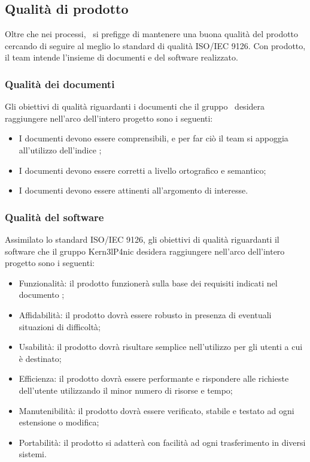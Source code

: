 \documentclass[../PianoDiQualifica.tex]{subfiles}
\begin{document}
		\subsection{Qualità di prodotto}
		Oltre che nei processi, \kpanic\ si prefigge di mantenere una buona qualità del prodotto cercando di seguire al meglio lo standard di qualità ISO/IEC 9126. Con prodotto, il team intende l'insieme di documenti e del software realizzato.
			\subsubsection{Qualità dei documenti}
			Gli obiettivi di qualità riguardanti i documenti che il gruppo \kpanic\ desidera raggiungere nell'arco dell'intero progetto sono i seguenti:
			\begin{itemize}
				\item I documenti devono essere comprensibili, e per far ciò il team si appoggia all'utilizzo dell'indice ;
				\item I documenti devono essere corretti a livello ortografico e semantico;
				\item I documenti devono essere attinenti all'argomento di interesse.
			\end{itemize}
			\subsubsection{Qualità del software}
			Assimilato lo standard ISO/IEC 9126, gli obiettivi di qualità riguardanti il software che il gruppo Kern3lP4nic desidera raggiungere nell'arco dell'intero progetto sono i seguenti:
			\begin{itemize}
				\item Funzionalità: il prodotto funzionerà sulla base dei requisiti indicati nel documento \analisideirequisitiv;
				\item Affidabilità: il prodotto dovrà essere robusto in presenza di eventuali situazioni di difficoltà;
				\item Usabilità: il prodotto dovrà risultare semplice nell'utilizzo per gli utenti a cui è destinato;
				\item Efficienza: il prodotto dovrà essere performante e rispondere alle richieste dell'utente utilizzando il minor numero di risorse e tempo;
				\item Manutenibilità: il prodotto dovrà essere verificato, stabile e testato ad ogni estensione o modifica;
				\item Portabilità: il prodotto si adatterà con facilità ad ogni trasferimento in diversi sistemi.
			\end{itemize}
\end{document}
